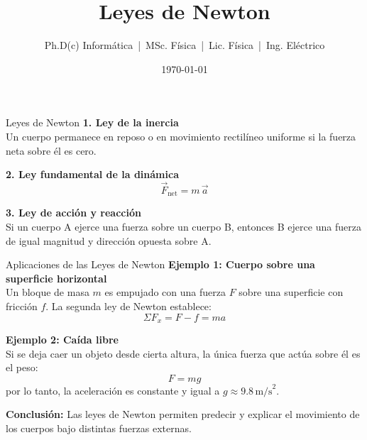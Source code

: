 \documentclass{beamer}
\title{Leyes de Newton}
\author{Ph.D(c) Informática \,|\, MSc. Física \,|\, Lic. Física \,|\, Ing. Eléctrico}
\date{\today}
\begin{document}
\begin{frame}{Leyes de Newton}
\textbf{1. Ley de la inercia} \\
Un cuerpo permanece en reposo o en movimiento rectilíneo uniforme si la fuerza neta sobre él es cero.

\vspace{0.4cm}
\textbf{2. Ley fundamental de la dinámica} \\
\[
\vec{F}_{\text{net}} = m \, \vec{a}
\]

\vspace{0.4cm}
\textbf{3. Ley de acción y reacción} \\
Si un cuerpo A ejerce una fuerza sobre un cuerpo B, entonces B ejerce una fuerza de igual magnitud y dirección opuesta sobre A.
\end{frame}

\begin{frame}{Aplicaciones de las Leyes de Newton}
	\textbf{Ejemplo 1: Cuerpo sobre una superficie horizontal} \\[4pt]
	Un bloque de masa \( m \) es empujado con una fuerza \( F \) sobre una superficie con fricción \( f \).  
	La segunda ley de Newton establece:
	\[
	\Sigma F_x = F - f = m a
	\]
	
	\vspace{0.4cm}
	\textbf{Ejemplo 2: Caída libre} \\[4pt]
	Si se deja caer un objeto desde cierta altura, la única fuerza que actúa sobre él es el peso:
	\[
	F = m g
	\]
	por lo tanto, la aceleración es constante y igual a \( g \approx 9.8\,\text{m/s}^2 \).
	
	\vspace{0.4cm}
	\textbf{Conclusión:} Las leyes de Newton permiten predecir y explicar el movimiento de los cuerpos bajo distintas fuerzas externas.
\end{frame}
\end{document}
